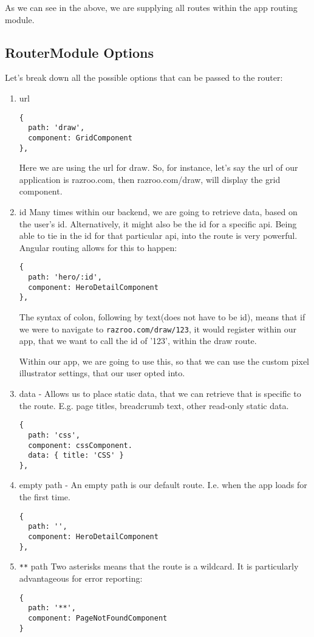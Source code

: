 As we can see in the above, we are supplying all routes within the app routing
module.

\subsection{ RouterModule Options }
Let's break down all the possible options that can be passed to the router:
\begin{enumerate}
\item url
\begin{lstlisting}
{
  path: 'draw',
  component: GridComponent
},
\end{lstlisting}
Here we are using the url for draw. So, for instance, let's say the url
of our application is razroo.com, then razroo.com/draw, will display
the grid component.
\item id
Many times within our backend, we are going to retrieve data, based on the 
user's id. Alternatively, it might also be the id for a specific api. Being
able to tie in the id for that particular api, into the route is very 
powerful. Angular routing allows for this to happen: 
\begin{lstlisting}
{
  path: 'hero/:id', 
  component: HeroDetailComponent 
},
\end{lstlisting}
The syntax of colon, following by text(does not have to be id), means that 
if we were to navigate to \lstinline{razroo.com/draw/123}, it would 
register within our app, that we want to call the id of '123', within
the draw route. 

Within our app, we are going to use this, so that we can use the custom 
pixel illustrator settings, that our user opted into. 
\item data - Allows us to place static data, that we can retrieve that is 
specific to the route. E.g. page titles, breadcrumb text, other read-only 
static data.
\begin{lstlisting}
{
  path: 'css', 
  component: cssComponent.
  data: { title: 'CSS' }
},
\end{lstlisting}
\item empty path - An empty path is our default route. I.e. when the app 
loads for the first time. 
\begin{lstlisting}
{
  path: '', 
  component: HeroDetailComponent 
},
\end{lstlisting}
\item \lstinline{**} path
Two asterisks means that the route is a wildcard. It is particularly 
advantageous for error reporting: 
\begin{lstlisting}
{
  path: '**',
  component: PageNotFoundComponent 
}
\end{lstlisting}
\end{enumerate}

